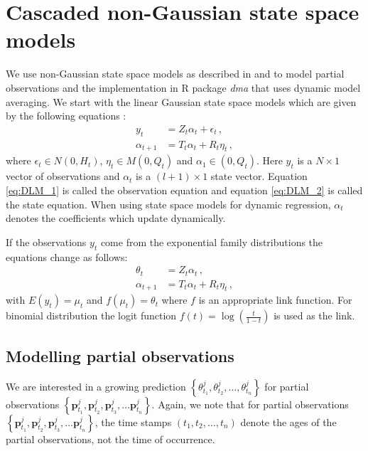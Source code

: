 \documentclass[11pt]{article}
\begin{document}
	\section{Cascaded non-Gaussian state space models} \label{sec:CascadedDLM}
	We use non-Gaussian state space models as described in \cite{durbin1998time} and  \cite{mccormick2012dynamic} to model partial observations and the implementation in R package {\it dma} \cite{dma} that uses dynamic model averaging. We start with the linear Gaussian state space models which are given by the following equations :
	\begin{align}
	y_t & = Z_t \alpha_t + \epsilon_t \, ,  \label{eq:DLM_1} \\
	\alpha_{t+1} & = T_t \alpha_t + R_t \eta_t \, ,  \label{eq:DLM_2}
	\end{align}
	where $\epsilon_t \in N \left(0, H_t\right)$,  $\eta_t \in M \left(0, Q_t\right)$ and $\alpha_1 \in \left(0, Q_t\right)$. Here $y_t$ is a $N \times 1 $ vector of observations and $\alpha_t$ is a $(l+1) \times 1$ state vector. Equation \eqref{eq:DLM_1} is called the observation equation and equation \eqref{eq:DLM_2} is called the state equation. When using state space models for dynamic regression, $\alpha_t$ denotes the coefficients which update dynamically. 
	
	If the observations $y_t$ come from the exponential family distributions the equations change as follows:
	\begin{align}
		\theta_t & = Z_t \alpha_t \, ,  \label{eq:GDLM_2} \\
		\alpha_{t+1} & = T_t \alpha_t + R_t \eta_t  \, ,  \label{eq:GDLM_3}
	\end{align}
	with $E \left( y_t \right ) = \mu_t $ and $f\left( \mu_t \right ) = \theta_t $ where $f$ is an appropriate link function. For binomial distribution the logit function $f(t)=\log\left( \frac{t}{1-t}\right)$ is used as the link. 
	
	\subsection{Modelling partial observations}
	We are interested in a growing prediction $\left\{   \theta^j_{t_1}, \theta^j_{t_2}, \ldots, \theta^j_{t_n} \right\}$   for partial observations $\left\{\mathbf{p}^j_{t_1},\mathbf{p}^j_{t_2}, \mathbf{p}^j_{t_3}, \ldots \mathbf{p}^j_{t_n}  \right\}$. Again, we note that for  partial observations $\left\{\mathbf{p}^j_{t_1},\mathbf{p}^j_{t_2}, \mathbf{p}^j_{t_3}, \ldots \mathbf{p}^j_{t_n}  \right\}$, the time stamps $\left(t_1, t_2, \ldots, t_n \right)$ denote the ages of the partial observations, not the time of occurrence. %
	
\end{document}
